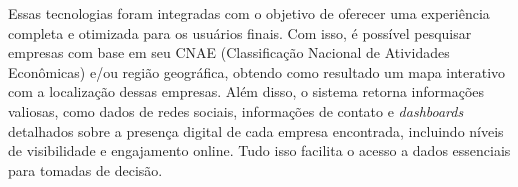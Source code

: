 Essas tecnologias foram integradas com o objetivo de oferecer uma experiência completa e otimizada para os usuários finais. Com isso, é possível pesquisar empresas com base em seu CNAE (Classificação Nacional de Atividades Econômicas) e/ou região geográfica, obtendo como resultado um mapa interativo com a localização dessas empresas. Além disso, o sistema retorna informações valiosas, como dados de redes sociais, informações de contato e \textit{dashboards} detalhados sobre a presença digital de cada empresa encontrada, incluindo níveis de visibilidade e engajamento online. Tudo isso facilita o acesso a dados essenciais para tomadas de decisão.\par
